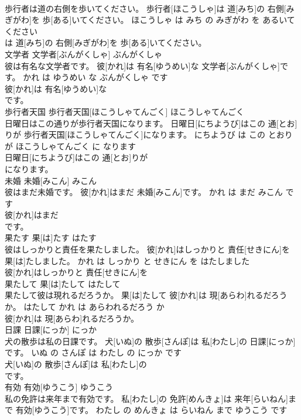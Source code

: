 \documentclass[8pt]{extreport}
\begin{document}
\begin{CJK}{UTF8}{min}
\\	歩行者は道の右側を歩いてください。	歩行者[ほこうしゃ]は 道[みち]の 右側[みぎがわ]を 歩[ある]いてください。	ほこうしゃ は みち の みぎがわ を あるいて ください	
\\	は 道[みち]の 右側[みぎがわ]を 歩[ある]いてください。			
\\	文学者	文学者[ぶんがくしゃ]	ぶんがくしゃ	
\\	彼は有名な文学者です。	彼[かれ]は 有名[ゆうめい]な 文学者[ぶんがくしゃ]です。	かれ は ゆうめい な ぶんがくしゃ です	
\\	彼[かれ]は 有名[ゆうめい]な
\\	です。			
\\	歩行者天国	歩行者天国[ほこうしゃてんごく]	ほこうしゃてんごく	
\\	日曜日はこの通りが歩行者天国になります。	日曜日[にちようび]はこの 通[とお]りが 歩行者天国[ほこうしゃてんごく]になります。	にちようび は この とおり が ほこうしゃてんごく に なります	
\\	日曜日[にちようび]はこの 通[とお]りが
\\	になります。			
\\	未婚	未婚[みこん]	みこん	
\\	彼はまだ未婚です。	彼[かれ]はまだ 未婚[みこん]です。	かれ は まだ みこん です	
\\	彼[かれ]はまだ
\\	です。			
\\	果たす	果[は]たす	はたす	
\\	彼はしっかりと責任を果たしました。	彼[かれ]はしっかりと 責任[せきにん]を 果[は]たしました。	かれ は しっかり と せきにん を はたしました	
\\	彼[かれ]はしっかりと 責任[せきにん]を
\\	果たして	果[は]たして	はたして	
\\	果たして彼は現れるだろうか。	果[は]たして 彼[かれ]は 現[あらわ]れるだろうか。	はたして かれ は あらわれるだろう か	
\\	彼[かれ]は 現[あらわ]れるだろうか。			
\\	日課	日課[にっか]	にっか	
\\	犬の散歩は私の日課です。	犬[いぬ]の 散歩[さんぽ]は 私[わたし]の 日課[にっか]です。	いぬ の さんぽ は わたし の にっか です	
\\	犬[いぬ]の 散歩[さんぽ]は 私[わたし]の
\\	です。			
\\	有効	有効[ゆうこう]	ゆうこう	
\\	私の免許は来年まで有効です。	私[わたし]の 免許[めんきょ]は 来年[らいねん]まで 有効[ゆうこう]です。	わたし の めんきょ は らいねん まで ゆうこう です	

\end{CJK}
\end{document}
